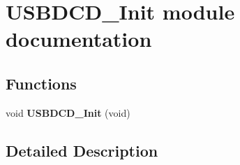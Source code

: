 \hypertarget{group___u_s_b_d_c_d___init__module}{}\section{U\+S\+B\+D\+C\+D\+\_\+\+Init module documentation}
\label{group___u_s_b_d_c_d___init__module}
\subsection*{Functions}
\begin{DoxyCompactItemize}
\item 
void {\bfseries U\+S\+B\+D\+C\+D\+\_\+\+Init} (void)\hypertarget{group___u_s_b_d_c_d___init__module_ga4d15dbc2837524fb833f5182eca75b13}{}\label{group___u_s_b_d_c_d___init__module_ga4d15dbc2837524fb833f5182eca75b13}

\end{DoxyCompactItemize}


\subsection{Detailed Description}
